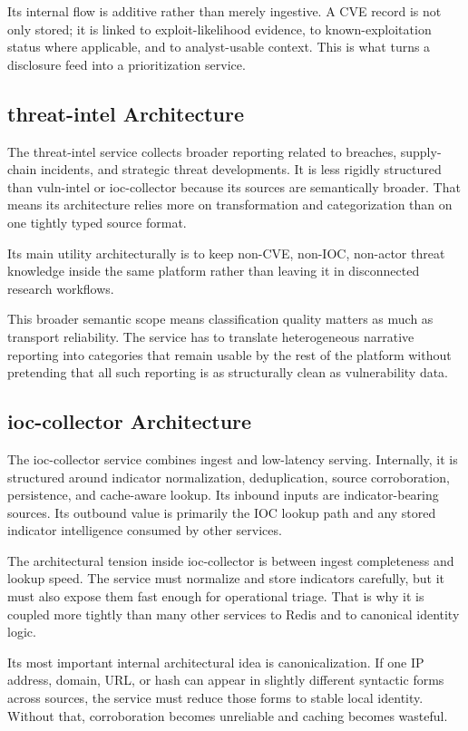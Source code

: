 Its internal flow is additive rather than merely ingestive. A CVE record is not only stored; it is linked to exploit-likelihood evidence, to known-exploitation status where applicable, and to analyst-usable context. This is what turns a disclosure feed into a prioritization service.

\subsection{threat-intel Architecture}
The threat-intel service collects broader reporting related to breaches, supply-chain incidents, and strategic threat developments. It is less rigidly structured than vuln-intel or ioc-collector because its sources are semantically broader. That means its architecture relies more on transformation and categorization than on one tightly typed source format.

Its main utility architecturally is to keep non-CVE, non-IOC, non-actor threat knowledge inside the same platform rather than leaving it in disconnected research workflows.

This broader semantic scope means classification quality matters as much as transport reliability. The service has to translate heterogeneous narrative reporting into categories that remain usable by the rest of the platform without pretending that all such reporting is as structurally clean as vulnerability data.

\subsection{ioc-collector Architecture}
The ioc-collector service combines ingest and low-latency serving. Internally, it is structured around indicator normalization, deduplication, source corroboration, persistence, and cache-aware lookup. Its inbound inputs are indicator-bearing sources. Its outbound value is primarily the IOC lookup path and any stored indicator intelligence consumed by other services.

The architectural tension inside ioc-collector is between ingest completeness and lookup speed. The service must normalize and store indicators carefully, but it must also expose them fast enough for operational triage. That is why it is coupled more tightly than many other services to Redis and to canonical identity logic.

Its most important internal architectural idea is canonicalization. If one IP address, domain, URL, or hash can appear in slightly different syntactic forms across sources, the service must reduce those forms to stable local identity. Without that, corroboration becomes unreliable and caching becomes wasteful.

